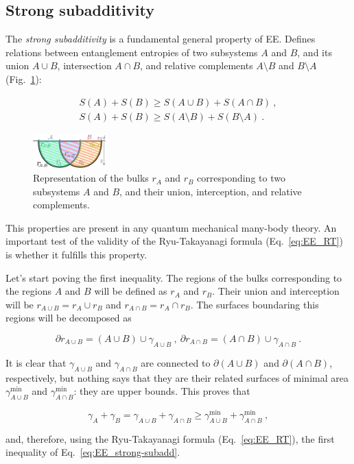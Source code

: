 \documentclass[twocolumn]{revtex4}
\providecommand{\eq}[2]{
    \begin{equation}
        #2
    \label{eq:#1}
    \end{equation}
}
\providecommand{\eqgat}[2]{
    \begin{gather}
        #2
    \label{eq:#1}
    \end{gather}
}
\begin{document}
\subsection{Strong subadditivity} \label{ss:SS}

The \textit{strong subadditivity} \cite{headrick_holographic_2007} is a fundamental general property of EE. Defines relations between entanglement entropies of two subsystems $A$ and $B$, and its union $A \cup B$, intersection $A \cap B$, and relative complements $A \setminus B$ and $B \setminus A$ (Fig.~\ref{fig:SS}):
\eqgat{EE_strong-subadd}{
    S(A) + S(B) \ge S(A \cup B) + S(A \cap B) \ , \nonumber \\
    S(A) + S(B) \ge S(A \setminus B) + S(B \setminus A) \ .
}

\begin{figure}
    \centering
    \includegraphics[width=0.25\textwidth]{../imatges/SS_D.png}
\caption{Representation of the bulks $r_A$ and $r_B$ corresponding to two subsystems $A$ and $B$, and their union, interception, and relative complements.}
\label{fig:SS}
\end{figure}

This properties are present in any quantum mechanical many-body theory. An important test of the validity of the Ryu-Takayanagi formula (Eq.~\ref{eq:EE_RT}) is whether it fulfills this property.

Let's start poving the first inequality. The regions of the bulks corresponding to the regions $A$ and $B$ will be defined as $r_A$ and $r_B$. Their union and interception will be $r_{A \cup B} = r_A \cup r_B$ and $r_{A \cap B} = r_A \cap r_B$. The surfaces boundaring this regions will be decomposed as
\eq{SS_dr-1}{
    \partial r_{A \cup B} = (A \cup B) \cup \gamma_{A \cup B} \ , \ \partial r_{A \cap B } = (A \cap B) \cup \gamma_{A \cap B} \ .
}
It is clear that $\gamma_{A \cup B}$ and $\gamma_{A \cap B}$ are connected to $\partial (A \cup B)$ and $\partial (A \cap B)$, respectively, but nothing says that they are their related surfaces of minimal area $\gamma^{\text{min}}_{A \cup B}$ and $\gamma^{\text{min}}_{A \cap B}$: they are upper bounds. This proves that
\eq{SS_gamma-1}{
    \gamma_A + \gamma_B = \gamma_{A \cup B} + \gamma_{A \cap B} \ge \gamma^{\text{min}}_{A \cup B} + \gamma^{\text{min}}_{A \cap B} \ ,
}
and, therefore, using the Ryu-Takayanagi formula (Eq.~\ref{eq:EE_RT}), the first inequality of Eq.~\ref{eq:EE_strong-subadd}.
\end{document}
